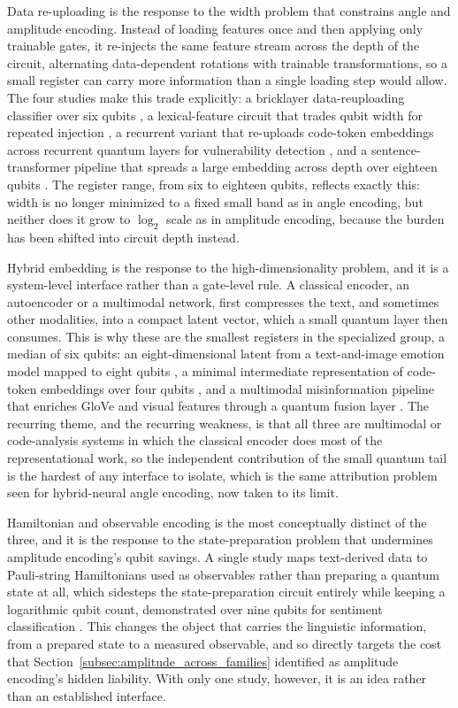 \documentclass{ieeeaccess}
\begin{document}
Data re-uploading is the response to the width problem that constrains angle and amplitude encoding. Instead of loading features once and then applying only trainable gates, it re-injects the same feature stream across the depth of the circuit, alternating data-dependent rotations with trainable transformations, so a small register can carry more information than a single loading step would allow. The four studies make this trade explicitly: a bricklayer data-reuploading classifier over six qubits \cite{hamilton_characterizing_2023}, a lexical-feature circuit that trades qubit width for repeated injection \cite{silver_lexiql_2024}, a recurrent variant that re-uploads code-token embeddings across recurrent quantum layers for vulnerability detection \cite{song_recurrent_2024}, and a sentence-transformer pipeline that spreads a large embedding across depth over eighteen qubits \cite{kim_quantum_2025}. The register range, from six to eighteen qubits, reflects exactly this: width is no longer minimized to a fixed small band as in angle encoding, but neither does it grow to $\log_2$ scale as in amplitude encoding, because the burden has been shifted into circuit depth instead.

Hybrid embedding is the response to the high-dimensionality problem, and it is a system-level interface rather than a gate-level rule. A classical encoder, an autoencoder or a multimodal network, first compresses the text, and sometimes other modalities, into a compact latent vector, which a small quantum layer then consumes. This is why these are the smallest registers in the specialized group, a median of six qubits: an eight-dimensional latent from a text-and-image emotion model mapped to eight qubits \cite{castrignano_toward_2025}, a minimal intermediate representation of code-token embeddings over four qubits \cite{akter_automated_2023}, and a multimodal misinformation pipeline that enriches GloVe and visual features through a quantum fusion layer \cite{bikku_quantum-enhanced_2025}. The recurring theme, and the recurring weakness, is that all three are multimodal or code-analysis systems in which the classical encoder does most of the representational work, so the independent contribution of the small quantum tail is the hardest of any interface to isolate, which is the same attribution problem seen for hybrid-neural angle encoding, now taken to its limit.

Hamiltonian and observable encoding is the most conceptually distinct of the three, and it is the response to the state-preparation problem that undermines amplitude encoding's qubit savings. A single study maps text-derived data to Pauli-string Hamiltonians used as observables rather than preparing a quantum state at all, which sidesteps the state-preparation circuit entirely while keeping a logarithmic qubit count, demonstrated over nine qubits for sentiment classification \cite{tiblias_efficient_2026}. This changes the object that carries the linguistic information, from a prepared state to a measured observable, and so directly targets the cost that Section~\ref{subsec:amplitude_across_families} identified as amplitude encoding's hidden liability. With only one study, however, it is an idea rather than an established interface.
\end{document}
